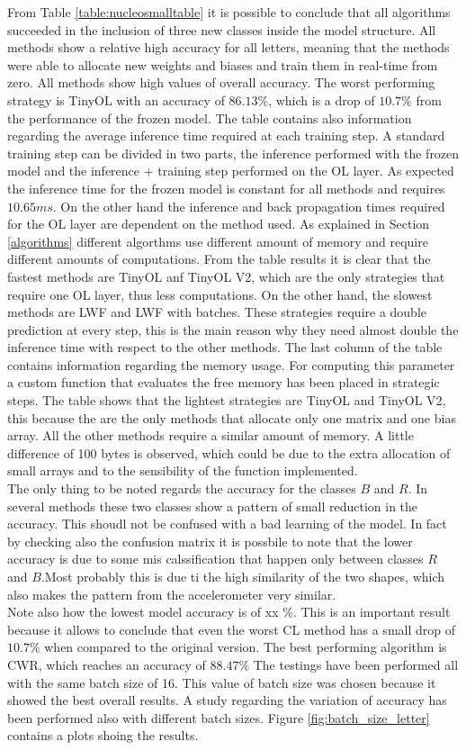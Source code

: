 \documentclass[12pt]{report}
\begin{document}
From Table \ref{table:nucleosmalltable} it is possible to conclude that all algorithms succeeded in the inclusion of three new classes inside the model structure. All methods show a relative high accuracy for all letters, meaning that the methods were able to allocate new weights and biases and train them in real-time from zero. All methods show high values of overall accuracy. The worst performing strategy is TinyOL with an accuracy of $86.13 \%$, which is a drop of $10.7 \%$ from the performance of the frozen model. The table contains also information regarding the average inference time required at each training step. A standard training step can be divided in two parts, the inference performed with the frozen model and the inference + training step performed on the OL layer. As expected the inference time for the frozen model is constant for all methods and requires $10.65 ms$. On the other hand the inference and back propagation times required for the OL layer are dependent on the method used. As explained in Section \ref{algorithms} different algorthms use different amount of memory and require different amounts of computations. From the table results it is clear that the fastest methods are TinyOL anf TinyOL V2, which are the only strategies that require one OL layer, thus less computations. On the other hand, the slowest methods are LWF and LWF with batches. These strategies require a double prediction at every step, this is the main reason why they need almost double the inference time with respect to the other methods. The last column of the table contains information regarding the memory usage. For computing this parameter a custom function that evaluates the free memory has been placed in strategic steps. The table shows that the lightest strategies are TinyOL and TinyOL V2, this because the are the only methods that allocate only one matrix and one bias array. All the other methods require a similar amount of memory. A little difference of 100 bytes is observed, which could be due to the extra allocation of small arrays and to the sensibility of the function implemented.\\
The only thing to be noted regards the accuracy for the classes $B$ and $R$. In several methods these two classes show a pattern of small reduction in the accuracy. This shoudl not be confused with a bad learning of the model. In fact by checking also the confusion matrix it is possbile to note that the lower accuracy is due to some mis calssification that happen only between classes $R$ and $B$.Most probably this is due ti the high similarity of the two shapes, which also makes the pattern from the accelerometer very similar.\\ 
Note also how the lowest model accuracy is of xx \%. This is an important result because it allows to conclude that even the worst CL method has a small drop of $10.7 \%$ when compared to the original version. The best performing algorithm is CWR, which reaches an accuracy of $88.47 \%$
The testings have been performed all with the same batch size of 16. This value of batch size was chosen because it showed the best overall results. A study regarding the variation of accuracy has been performed also with different batch sizes. Figure \ref{fig:batch_size_letter} contains a plots shoing the results.
\end{document}
